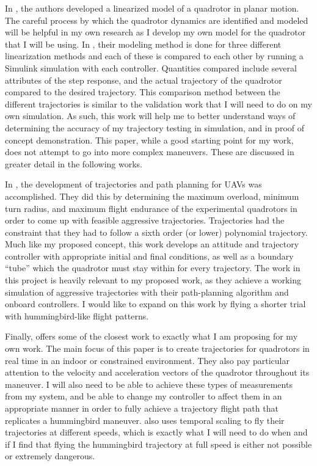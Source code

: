 \documentclass[onecolumn,10pt]{IEEEtran}
\begin{document}
In \cite{sabatino2015quadrotor}, the authors developed a linearized model of a quadrotor in planar motion. The careful process by which the quadrotor dynamics are identified and modeled will be helpful in my own research as I develop my own model for the quadrotor that I will be using. In \cite{sabatino2015quadrotor}, their modeling method is done for three different linearization methods and each of these is compared to each other by running a Simulink simulation with each controller. Quantities compared include several attributes of the step response, and the actual trajectory of the quadrotor compared to the desired trajectory. This comparison method between the different trajectories is similar to the validation work that I will need to do on my own simulation. As such, this work will help me to better understand ways of determining the accuracy of my trajectory testing in simulation, and in proof of concept demonstration. This paper, while a good starting point for my work, does not attempt to go into more complex maneuvers. These are discussed in greater detail in the following works.

In \cite{liu2017planning}, the development of trajectories and path planning for UAVs was accomplished. They did this by determining the maximum overload, minimum turn radius, and maximum flight endurance of the experimental quadrotors in order to come up with feasible aggressive trajectories. Trajectories had the constraint that they had to follow a sixth order (or lower) polynomial trajectory. Much like my proposed concept, this work develops an attitude and trajectory controller with appropriate initial and final conditions, as well as a boundary “tube” which the quadrotor must stay within for every trajectory. The work in this project is heavily relevant to my proposed work, as they achieve a working simulation of aggressive trajectories with their path-planning algorithm and onboard controllers. I would like to expand on this work by flying a shorter trial with hummingbird-like flight patterns. 

Finally, \cite{mellinger2011minimum} offers some of the closest work to exactly what I am proposing for my own work. The main focus of this paper is to create trajectories for quadrotors in real time in an indoor or constrained environment. They also pay particular attention to the velocity and acceleration vectors of the quadrotor throughout its maneuver. I will also need to be able to achieve these types of measurements from my system, and be able to change my controller to affect them in an appropriate manner in order to fully achieve a trajectory flight path that replicates a hummingbird maneuver. \cite{mellinger2011minimum} also uses temporal scaling to fly their trajectories at different speeds, which is exactly what I will need to do when and if I find that flying the hummingbird trajectory at full speed is either not possible or extremely dangerous. 
\end{document}

